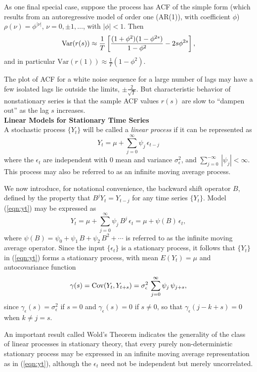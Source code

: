 As one final special case, suppose the process  has ACF of the simple form (which results from an autoregressive model of order one (AR(1)), with coefficient $\phi$) $\rho(\nu) = \phi^{|\nu|}$, $\nu=0, \pm 1, \ldots$, with $|\phi| < 1$. Then
	\[
	\operatorname{Var}(r(s)) \approx \frac{1}{T} \left[\frac{(1+\phi^2)(1-\phi^{2s})}{1-\phi^2} - 2s\phi^{2s}\right],
	\]
and in particular $\text{Var}(r(1)) \approx \frac{1}{T} (1-\phi^2)$.


The plot of ACF for a white noise sequence for a large number of lags may have a few isolated lags lie outside the limits, $\pm \frac{2}{\sqrt{T}}$. But characteristic behavior of nonstationary series is that the sample ACF values $r(s)$ are slow to ``dampen out'' as the lag $s$ increases. \\


\noindent\textbf{Linear Models for Stationary Time Series} \\


A stochastic process $\{Y_t\}$ will be called a \textit{linear process} if it can be represented as
	\begin{equation}\label{eqn:yt}
          Y_t = \mu + \sum_{j=0}^{\infty}  \psi_j \,  \epsilon_{t-j}
	\end{equation}
where the $\epsilon_t$ are independent with 0 mean and variance $\sigma^2_{\epsilon}$, and $\sum_{j=0}^{-\infty} \, |\psi_j | < \infty$. This process may also be referred to as an infinite moving average process.


We now introduce, for notational convenience, the backward shift operator $B$, defined by the property that $B^j Y_t= Y_{t-j}$ for any time series $\{Y_t\}$. Model (\ref{eqn:yt}) may be expressed as
	\[
	Y_t = \mu + \sum_{j=0}^{\infty} \psi_j \,  B^j \, \epsilon_t = \mu + \psi(B) \, \epsilon_t,
	\]
where $\psi(B) = \psi_0 + \psi_1 \, B + \psi_2 \, B^2 + \cdots$ is referred to as the infinite moving average operator. Since the input $\{\epsilon_t\}$ is a stationary process, it follows that $\{Y_t\}$ in (\ref{eqn:yt}) forms a stationary process, with mean $E(Y_t)=\mu$ and autocovariance function
	\begin{equation}\label{eqn:covyt}
	\gamma(s)= \Cov(Y_t, Y_{t+s})=\sigma^2_{\epsilon} \, \sum_{j=0}^{\infty} \psi_j \, \psi_{j+s},
	\end{equation}      
since $\gamma_{\epsilon}(s) = \sigma^2_{\epsilon}$ if $s=0$ and $\gamma_{\epsilon}(s) = 0$ if $s \neq 0$, so that $\gamma_{\epsilon}(j-k+s) = 0$ when $k \neq j=s$.
	

An important result called Wold's Theorem indicates the generality of the class of linear processes in stationary theory, that every purely non-deterministic stationary process may be expressed in an infinite moving average representation as in (\ref{eqn:yt}), although the $\epsilon_t$ need not be independent but merely uncorrelated.	


